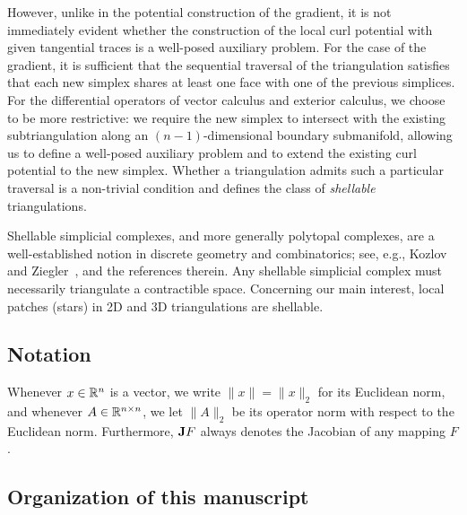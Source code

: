\documentclass[10pt,a4paper]{article}
\begin{document}

However, unlike in the potential construction of the gradient, it is not immediately evident whether the construction of the local curl potential with given tangential traces is a well-posed auxiliary problem.
For the case of the gradient, it is sufficient that the sequential traversal of the triangulation satisfies that each new simplex shares at least one face with one of the previous simplices.
For the differential operators of vector calculus and exterior calculus, we choose to be more restrictive:
we require the new simplex to intersect with the existing subtriangulation along an $(n-1)$-dimensional boundary submanifold, allowing us to define a well-posed auxiliary problem and to extend the existing curl potential to the new simplex.
Whether a triangulation admits such a particular traversal is a non-trivial condition and defines the class of \emph{shellable} triangulations.

 
 
 
 
Shellable simplicial complexes, and more generally polytopal complexes, are a well-established notion in discrete geometry and combinatorics; see, e.g., Kozlov~\cite{kozlov2008combinatorial} and Ziegler~\cite{ziegler1995lectures}, and the references therein.
Any shellable simplicial complex must necessarily triangulate a contractible space.
Concerning our main interest, local patches (stars) in 2D and 3D triangulations are shellable.

















\subsection{Notation}

Whenever $x \in {\mathbb R}^{n}$ is a vector, we write $\|x\| = \|x\|_{2}$ for its Euclidean norm, 
and whenever $A \in {\mathbb R}^{n \times n}$, we let $\| A \|_{2}$ be its operator norm with respect to the Euclidean norm. 
Furthermore, ${\mathbf{J}} F$ always denotes the Jacobian of any mapping $F$. 




\subsection{Organization of this manuscript}
\end{document}

